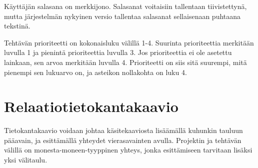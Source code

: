 \documentclass[12pt,a4paper,oneside,titlepage,pdftex]{article}
\begin{document}
\begin{table}[htbp]
\renewcommand{\arraystretch}{1.2}
\caption{Järjestelmän tietokohteiden kuvaukset}
\end{table}

Käyttäjän salasana on merkkijono. Salasanat voitaisiin tallentaan tiivistettynä, mutta järjestelmän nykyinen versio tallentaa salasanat sellaisenaan puhtaana tekstinä.

Tehtävän prioriteetti on kokonaisluku välillä 1-4. Suurinta prioriteettia merkitään luvulla 1 ja pienintä prioriteettia luvulla 3. Jos prioriteettia ei ole asetettu lainkaan, sen arvoa merkitään luvulla 4. Prioriteetti on siis sitä suurempi, mitä pienempi sen lukuarvo on, ja asteikon nollakohta on luku 4.

\section{Relaatiotietokantakaavio}

Tietokantakaavio voidaan johtaa käsitekaaviosta lisäämällä kuhunkin tauluun pääavain, ja esittämällä yhteydet vierasavainten avulla. Projektin ja tehtävän välillä on monesta\hyp{}moneen\hyp{}tyyppinen yhteys, jonka esittämiseen tarvitaan lisäksi yksi välitaulu.
\end{document}
